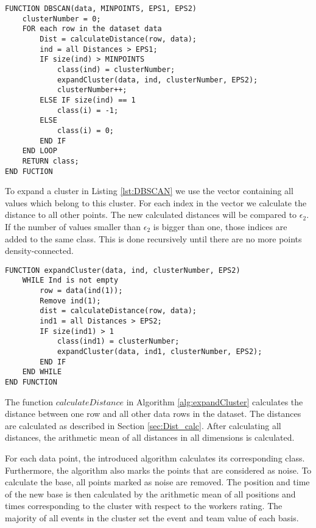\begin{lstlisting}[caption={Algorithm for the DBSCAN method},label={lst:DBSCAN}]
FUNCTION DBSCAN(data, MINPOINTS, EPS1, EPS2)
	clusterNumber = 0;
	FOR each row in the dataset data
		Dist = calculateDistance(row, data);
		ind = all Distances > EPS1;
		IF size(ind) > MINPOINTS
		    class(ind) = clusterNumber;
			expandCluster(data, ind, clusterNumber, EPS2);
			clusterNumber++;
		ELSE IF	size(ind) == 1
			class(i) = -1;
		ELSE
			class(i) = 0;		
		END IF
	END LOOP
	RETURN class;
END FUCTION
\end{lstlisting}


To expand a cluster in Listing \ref{lst:DBSCAN} we use the vector containing all values which belong to this cluster.
For each index in the vector we calculate the distance to all other points. The new calculated distances will be compared to $\epsilon_{2}$. If the number of values smaller than $\epsilon_{2}$ is bigger than one, those indices are added to the same class.
This is done recursively until there are no more points density-connected.

\begin{lstlisting}[caption={Algorithm to expand cluster}, label={alg:expandCluster}]
FUNCTION expandCluster(data, ind, clusterNumber, EPS2)
	WHILE Ind is not empty
		row = data(ind(1));
		Remove ind(1);
		dist = calculateDistance(row, data);
		ind1 = all Distances > EPS2;
		IF size(ind1) > 1
			class(ind1) = clusterNumber;
			expandCluster(data, ind1, clusterNumber, EPS2);
		END IF
	END WHILE
END FUNCTION
\end{lstlisting}

The function $calculateDistance$ in Algorithm \ref{alg:expandCluster} calculates the distance between one row and all other data rows in the dataset. The distances are calculated as described in Section \ref{sec:Dist_calc}.
After calculating all distances, the arithmetic mean of all distances in all dimensions is calculated.
\newline

For each data point, the introduced algorithm calculates its corresponding class. Furthermore, the algorithm also marks the points that are considered as noise.
To calculate the base, all points marked as noise are removed.
The position and time of the new base is then calculated by the arithmetic mean of all positions and times corresponding to the cluster with respect to the workers rating.
The majority of all events in the cluster set the event and team value of each basis.



